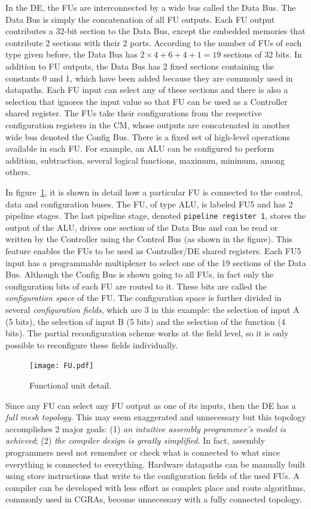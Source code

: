 \documentclass[journal]{IEEEtran}
\begin{document}
In the DE, the FUs are interconnected by a wide bus called the Data
Bus. The Data Bus is simply the concatenation of all FU outputs. Each
FU output contributes a 32-bit section to the Data Bus, except the
embedded memories that contribute 2 sections with their 2
ports. According to the number of FUs of each type given before, the
Data Bus has $2\times4+6+4+1=19$ sections of 32 bits. In addition to
FU outputs, the Data Bus has 2 fixed sections containing the constants
0 and 1, which have been added because they are commonly used in
datapaths. Each FU input can select any of these sections and there is
also a selection that ignores the input value so that FU can be used
as a Controller shared register. The FUs take their configurations
from the respective configuration registers in the CM, whose outputs
are concatenated in another wide bus denoted the Config Bus. There is
a fixed set of high-level operations available in each FU. For
example, an ALU can be configured to perform addition, subtraction,
several logical functions, maximum, minimum, among others.

In figure~\ref{fig_fu}, it is shown in detail how a particular FU is
connected to the control, data and configuration buses. The FU, of
type ALU, is labeled FU5 and has 2 pipeline stages. The last pipeline
stage, denoted {\tt pipeline register 1}, stores the output of the
ALU, drives one section of the Data Bus and can be read or written by
the Controller using the Control Bus (as shown in the figure). This
feature enables the FUs to be used as Controller/DE shared
registers. Each FU5 input has a programmable multiplexer to select one
of the 19 sections of the Data Bus. Although the Config Bus is shown
going to all FUs, in fact only the configuration bits of each FU are
routed to it. These bits are called the {\em configuration space} of
the FU. The configuration space is further divided in several {\em
  configuration fields}, which are 3 in this example: the selection of
input A (5 bits), the selection of input B (5 bits) and the selection
of the function (4 bits). The partial reconfiguration scheme works at
the field level, so it is only possible to reconfigure these fields
individually.

\begin{figure}[!h]
\centering
\texttt{[image: FU.pdf]}
\caption{Functional unit detail.}
\label{fig_fu}
\end{figure}

Since any FU can select any FU output as one of its inputs, then the
DE has a {\em full mesh topology}. This may seem exaggerated and
unnecessary but this topology accomplishes 2 major goals: (1) {\em an
  intuitive assembly programmer's model is achieved}; (2) {\em the
  compiler design is greatly simplified}. In fact, assembly
programmers need not remember or check what is connected to what since
everything is connected to everything. Hardware datapaths can be
manually built using store instructions that write to the
configuration fields of the used FUs. A compiler can be developed with
less effort as complex place and route algorithms, commonly used in
CGRAs, become unnecessary with a fully connected topology.
\end{document}
